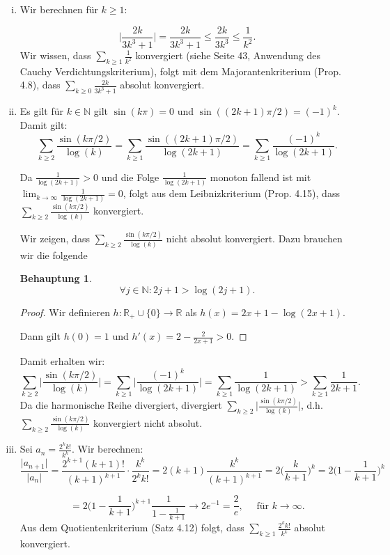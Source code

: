 \documentclass[a4paper, 20]{exam}
\newtheorem{claim}{Behauptung}
\newcommand\NN{\mathbb{N}}
\begin{document}
\begin{solution}
\begin{enumerate}[i.)]
\item
Wir berechnen f\"ur $k\geq 1$:

$$ \bigg\vert \frac{2k}{3k^3+1} \bigg\vert = \frac{2k}{3k^3+1}
\leq \frac{2k}{3k^3} \leq \frac{1}{k^2}.$$
Wir wissen, dass $\sum_{k\geq 1} \frac{1}{k^2}$ konvergiert (siehe Seite 43, Anwendung des Cauchy Verdichtungskriterium), folgt mit dem Majorantenkriterium (Prop. 4.8), dass $\sum_{k\geq 0} \frac{2k}{3k^3+1}$ absolut konvergiert.
\item
Es gilt f\"ur $k\in \NN$ gilt $\sin(k\pi)=0$ und $\sin((2k+1)\pi /2)=(-1)^k$. Damit gilt:
$$ \sum_{k\geq 2} \frac{\sin(k\pi/2)}{\log(k)} 
= \sum_{k\geq 1} \frac{\sin((2k+1)\pi/2)}{\log(2k+1)} 
= \sum_{k\geq 1} \frac{(-1)^k}{\log(2k+1)}.$$ 

Da $\frac{1}{\log(2k+1)}>0$ und die Folge $\frac{1}{\log(2k+1)}$ monoton fallend ist mit  $\lim_{k\rightarrow \infty} \frac{1}{\log(2k+1)}=0$, folgt aus dem Leibnizkriterium (Prop. 4.15), dass $\sum_{k\geq 2} \frac{\sin(k\pi/2)}{\log(k)}$ konvergiert.

Wir zeigen, dass $\sum_{k\geq 2} \frac{\sin(k\pi/2)}{\log(k)}$ nicht absolut konvergiert. Dazu brauchen wir die folgende
\begin{claim}
$$\forall j \in \NN: 2j +1 > \log(2j+1).$$
\end{claim}
\begin{proof}
Wir definieren $h: \mathbb{R}_+ \cup \{0\} \to \mathbb{R}$ als $h(x)= 2x+1-\log(2x+1)$. 

Dann gilt $h(0)=1$ und $h'(x)= 2 - \frac{2}{2x+1} >0$.
\end{proof}
Damit erhalten wir:
$$\sum_{k\geq 2} \bigg\vert \frac{\sin(k\pi/2)}{\log(k)} \bigg\vert
= \sum_{k\geq 1} \bigg\vert \frac{(-1)^k}{\log(2k+1)} \bigg\vert 
= \sum_{k\geq 1} \frac{1}{\log(2k+1)}
> \sum_{k\geq 1} \frac{1}{2k+1}.$$
Da die harmonische Reihe divergiert, divergiert $\sum_{k\geq 2} \bigg\vert \frac{\sin(k\pi/2)}{\log(k)} \bigg\vert$, d.h. $\sum_{k\geq 2} \frac{\sin(k\pi/2)}{\log(k)}$ konvergiert nicht absolut.
\item
Sei $a_n=\frac{2^{k}k!}{k^{k}}$. Wir berechnen:
$$ \frac{\vert a_{n+1} \vert}{\vert a_n \vert} 
= \frac{2^{k+1}(k+1)!}{(k+1)^{k+1}} \cdot \frac{k^{k}}{2^{k}k!}
= 2(k+1) \frac{k^k}{(k+1)^{k+1}} = 2 \bigg( \frac{k}{k+1} \bigg)^{k}
= 2 \bigg(1-\frac{1}{k+1}\bigg)^k$$

$$ = 2 \bigg(1-\frac{1}{k+1}\bigg)^{k+1} \frac{1}{1-\frac{1}{k+1}} \longrightarrow 2 e^{-1} = \frac{2}{e}, \quad \text{ f\"ur } k \longrightarrow \infty.$$
Aus dem Quotientenkriterium (Satz 4.12) folgt, dass $\sum_{k\geq 1} \frac{2^k k!}{k^k}$ absolut konvergiert.
\end{enumerate}
\end{solution}
\end{document}
